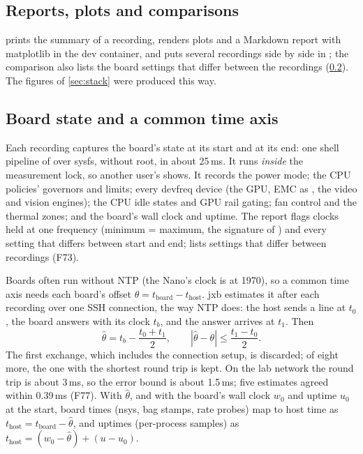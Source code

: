 \documentclass[11pt,a4paper]{article}
\newcommand{\jxb}{\textsf{jxb}}
\newcommand{\finding}[1]{\textsf{\small F#1}}
\begin{document}
\subsection{Reports, plots and comparisons}
 prints the summary of a recording,  renders plots and a Markdown report
with matplotlib in the dev container, and  puts several recordings side by
side in ; the comparison also lists the board settings that differ between the recordings
(\cref{sec:boardstate}). The figures of \cref{sec:stack} were produced this way.

\subsection{Board state and a common time axis}\label{sec:boardstate}
Each recording captures the board's state at its start and at its end: one shell pipeline of  over
sysfs, without root, in about 25\,ms. It runs \emph{inside} the measurement lock, so another user's
 shows. It records the power mode; the CPU policies' governors and limits; every devfreq device
(the GPU, EMC as , the video and vision engines); the CPU idle states and GPU rail gating; fan control and
the thermal zones; and the board's wall clock and uptime. The report flags clocks held at one frequency
(minimum = maximum, the signature of ) and every setting that differs between start and end;
 lists settings that differ between recordings (\finding{73}).

Boards often run without NTP (the Nano's clock is at 1970), so a common time axis needs each board's offset
$\theta = t_{\text{board}} - t_{\text{host}}$. \jxb{} estimates it after each recording over one SSH connection, the
way NTP does: the host sends a line at $t_0$, the board answers with its clock $t_b$, and the answer arrives at
$t_1$. Then
\begin{equation}
  \hat\theta = t_b - \frac{t_0 + t_1}{2}, \qquad |\hat\theta - \theta| \le \frac{t_1 - t_0}{2}.
\end{equation}
The first exchange, which includes the connection setup, is discarded; of eight more, the one with the shortest
round trip is kept. On the lab network the round trip is about 3\,ms, so the error bound is about 1.5\,ms; five
estimates agreed within 0.39\,ms (\finding{77}). With $\hat\theta$, and with the board's wall clock $w_0$ and uptime
$u_0$ at the start, board times (nsys, bag stamps, rate probes) map to host time as
$t_{\text{host}} = t_{\text{board}} - \hat\theta$, and uptimes (per-process samples) as
$t_{\text{host}} = (w_0 - \hat\theta) + (u - u_0)$.
\end{document}
